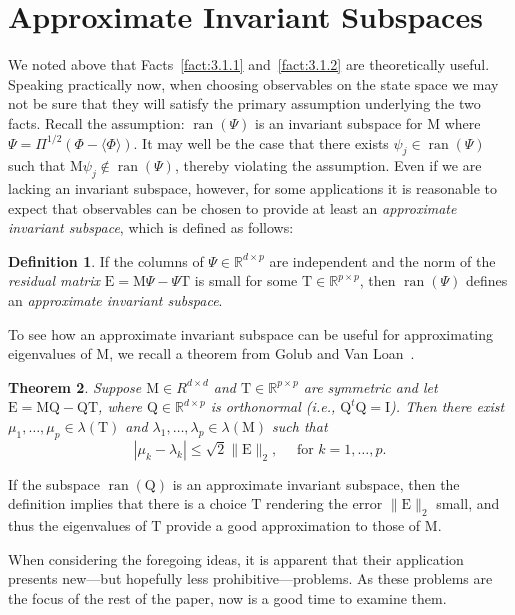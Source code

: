 \documentclass[12pt,letterpaper]{report}
\theoremstyle{plain}
\newtheorem{theorem}{Theorem}[chapter]
\theoremstyle{definition}
\newtheorem{definition}[theorem]{Definition}
\theoremstyle{remark}
\numberwithin{theorem}{chapter}
\numberwithin{claim}{chapter}
\numberwithin{equation}{chapter}
\numberwithin{conjecture}{chapter}
\newcommand\R{\ensuremath{\mathbb{R}}}
\newcommand\M{\ensuremath{\mathrm{M}}}
\newcommand\T{\ensuremath{\mathrm{T}}}
\newcommand\I{\ensuremath{\mathrm{I}}}
\newcommand\Q{\ensuremath{\mathrm{Q}}}
\newcommand\E{\ensuremath{\mathrm{E}}}
\newcommand\ran{\ensuremath{\operatorname{ran}}}
\newcommand\<{\ensuremath{\langle}}
\renewcommand\>{\ensuremath{\rangle}}
\begin{document}
\section{Approximate Invariant Subspaces}
\label{sec:appr-invar-subsp}
We noted above that Facts~\ref{fact:3.1.1} and~\ref{fact:3.1.2} are
theoretically useful. Speaking practically now,
when choosing observables on the state space we may not be sure that
they will satisfy the 
%
%
%
%
primary assumption underlying the two facts. %
Recall the assumption: $\ran(\Psi)$ is an invariant
subspace for $\M$ where $\Psi = \Pi^{1/2}(\Phi - \<\Phi\>)$. It may well be the
case that there exists $\psi_j\in \ran(\Psi)$ such that 
$\M\psi_j \notin \ran(\Psi)$, thereby violating the assumption. 
Even if we are lacking an invariant subspace, however, for some applications it
is reasonable to expect that observables can be chosen to provide at least
an \emph{approximate invariant subspace}, which is defined as follows:
\begin{definition}
If the columns of $\Psi\in \R^{d\times p}$ are independent and the norm of the
\emph{residual matrix} $\E = \M\Psi - \Psi \T$ is small for some  
$\T \in \R^{p\times p}$, then
$\ran(\Psi)$ defines an \emph{approximate invariant subspace}. 
\end{definition}
To see how an approximate invariant subspace can be useful for approximating
eigenvalues of $\M$, we recall a theorem from Golub and Van Loan~\cite{Golub:1996}.
\begin{theorem}
\label{thm:3.2.1}  
Suppose $\M \in R^{d\times d}$ and $\T \in \R^{p\times p}$ are symmetric and let
$\E = \M\Q - \Q\T$, where $\Q \in \R^{d\times p}$ is orthonormal 
(i.e., $\Q^t\Q = \I$). Then there exist $\mu_1,\dots, \mu_p \in \lambda(\T)$ and
$\lambda_1, \dots, \lambda_p \in \lambda(\M)$ such that
\[
|\mu_k - \lambda_k| \leq \sqrt{2}\|\E\|_2, \quad \text{ for $k = 1, \dots, p$.}
\]
\end{theorem}
If the subspace $\ran(\Q)$ is an approximate invariant subspace, then the definition implies that
there is a choice $\T$ rendering the error $\|\E\|_2$ small, and thus the
eigenvalues of $\T$ provide a good approximation to those of $\M$.

When considering the foregoing ideas, it is apparent that their application
presents new---but hopefully less prohibitive---problems. As these problems
are the focus of the rest of the paper, now is a good time to examine
them. 
\end{document}
